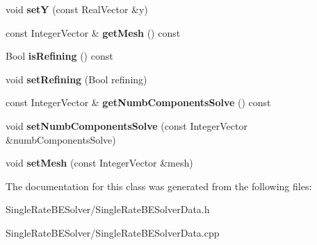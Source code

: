 \begin{DoxyCompactItemize}
\item 
\hypertarget{classSingleRateBESolverData_a1958d758dfd26da3d31efccecd753f1e}{
void {\bfseries setY} (const RealVector \&y)}
\label{classSingleRateBESolverData_a1958d758dfd26da3d31efccecd753f1e}

\item 
\hypertarget{classSingleRateBESolverData_ae86faf1673cc3b31042e2bf363972462}{
const IntegerVector \& {\bfseries getMesh} () const }
\label{classSingleRateBESolverData_ae86faf1673cc3b31042e2bf363972462}

\item 
\hypertarget{classSingleRateBESolverData_aae854bb373d3053328b7913d552af0ac}{
Bool {\bfseries isRefining} () const }
\label{classSingleRateBESolverData_aae854bb373d3053328b7913d552af0ac}

\item 
\hypertarget{classSingleRateBESolverData_a381969dea45142be23a62c1bfccfd300}{
void {\bfseries setRefining} (Bool refining)}
\label{classSingleRateBESolverData_a381969dea45142be23a62c1bfccfd300}

\item 
\hypertarget{classSingleRateBESolverData_a12444469b88c43c5756dfe5039cea6f9}{
const IntegerVector \& {\bfseries getNumbComponentsSolve} () const }
\label{classSingleRateBESolverData_a12444469b88c43c5756dfe5039cea6f9}

\item 
\hypertarget{classSingleRateBESolverData_aa94d2505f9aa0c283d5c4eba73968e76}{
void {\bfseries setNumbComponentsSolve} (const IntegerVector \&numbComponentsSolve)}
\label{classSingleRateBESolverData_aa94d2505f9aa0c283d5c4eba73968e76}

\item 
\hypertarget{classSingleRateBESolverData_ae04c513aea3527d3d70d35c82a333ddd}{
void {\bfseries setMesh} (const IntegerVector \&mesh)}
\label{classSingleRateBESolverData_ae04c513aea3527d3d70d35c82a333ddd}

\end{DoxyCompactItemize}


The documentation for this class was generated from the following files:\begin{DoxyCompactItemize}
\item 
SingleRateBESolver/SingleRateBESolverData.h\item 
SingleRateBESolver/SingleRateBESolverData.cpp\end{DoxyCompactItemize}

